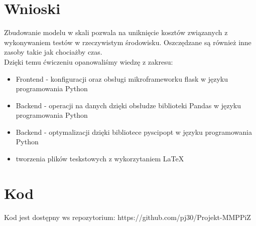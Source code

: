 \documentclass[11pt]{article}
\begin{document}
\section{Wnioski}
Zbudowanie modelu w skali pozwala na uniknięcie kosztów związanych z wykonywaniem testów w rzeczywistym środowisku. Oszczędzane są również inne zasoby takie jak chociażby czas.
\\Dzięki temu ćwiczeniu opanowaliśmy wiedzę z zakresu:
\begin{itemize}
	\item Frontend - konfiguracji oraz obsługi mikroframeworku flask w języku programowania Python
	\item Backend - operacji na danych dzięki obsłudze biblioteki Pandas w języku programowania Python
	\item Backend - optymalizacji dzięki bibliotece pyscipopt w języku programowania Python
	\item tworzenia plików teskstowych z wykorzytaniem LaTeX 
\end{itemize}

\newpage 

\section{Kod}
Kod jest dostępny ws repozytorium: 
https://github.com/pj30/Projekt-MMPPiZ
\end{document}

